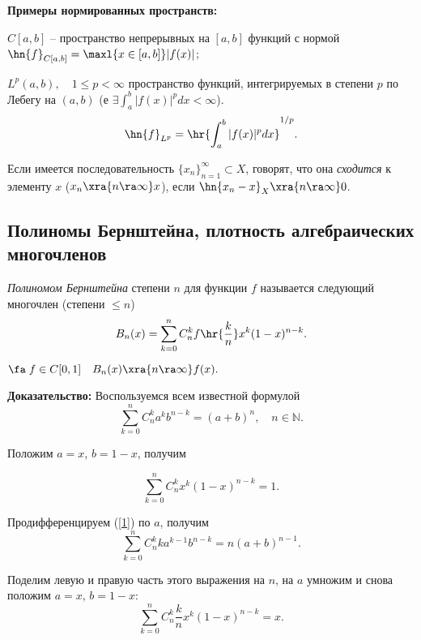 \documentclass{article}
\begin{document}
\noindent\textbf{Примеры нормированных пространств:}

\begin{denote}
  $C[a,b]$ -- пространство непрерывных на $[a,b]$ функций с нормой
  $\hn{f}_{C[a,b]}=\maxl{x\in[a,b]}|f(x)|$;
\end{denote}

\begin{denote}
  $L^p(a,b),\quad 1\le p<\infty$ пространство функций, интегрируемых в
  степени $p$ по Лебегу на $(a,b)$ (е
  $\exi\int_a^b|f(x)|^pdx<\infty$).
  $$\hn{f}_{L^p}=\hr{\int_a^b|f(x)|^pdx }^{1/p}.$$
\end{denote}

\begin{df}
  Если имеется последовательность
  $\{x_n\}_{n=1}^{\infty}\subset X$, говорят, что она
  \emph{сходится} к элементу $x$ ($x_n\xra{n\ra\infty} x$), если
  $\hn{x_n-x}_X\xra{n\ra\infty} 0$.
\end{df}

\subsection{Полиномы Бернштейна, плотность алгебраических
многочленов}

\begin{df}
  \emph{Полиномом Бернштейна} степени $n$ для функции
  $f$ называется следующий многочлен (степени $\le n$)
  $$B_n(x)=\sum\limits_{k=0}^n C_n^k f\hr{\frac{k}{n}}x^k(1-x)^{n-k}.$$
\end{df}
\begin{theorem}[Бернштейн]
$\fa \;f\in C[0,1]\quad B_n(x)\xra{n\ra\infty}
f(x).$
\end{theorem}
\textbf{Доказательство:} Воспользуемся всем известной формулой
\begin{equation}\label{1}
\sum_{k=0}^n C_n^k a^k b^{n-k}=(a+b)^n,\quad n\in\mathbb{N}.
\end{equation}

Положим $a=x$, $b=1-x$, получим

\begin{equation}\label{2}
\sum_{k=0}^n C_n^k x^k (1-x)^{n-k}=1.
\end{equation}

Продифференцируем (\ref{1}) по $a$, получим
\begin{equation}\label{3}
\sum_{k=0}^n C_n^k ka^{k-1} b^{n-k}=n(a+b)^{n-1}.
\end{equation}

Поделим левую и правую часть этого выражения на $n$, на $a$ умножим и снова положим $a=x$, $b=1-x$:
\begin{equation}\label{4}
\sum_{k=0}^n C_n^k \frac{k}{n}x^k(1-x)^{n-k}=x.
\end{equation}
\end{document}
